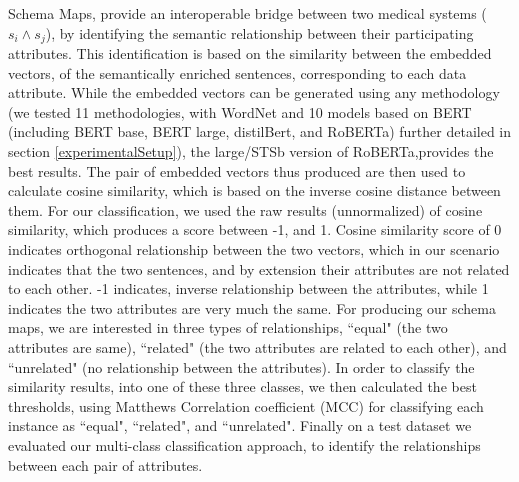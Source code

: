 \documentclass{ieeeaccess}
\begin{document}
Schema Maps, provide an interoperable bridge between two medical systems ($s_i \wedge s_j$), by identifying the semantic relationship between their participating attributes. This identification is based on the similarity between the embedded vectors, of the semantically enriched sentences, corresponding to each data attribute. While the embedded vectors can be generated using any methodology (we tested 11 methodologies, with WordNet and 10 models based on BERT (including BERT base, BERT large, distilBert, and RoBERTa) further detailed in section \ref{experimentalSetup}), the large/STSb version of RoBERTa\cite{reimers-2019-sentence-bert},provides the best results. The pair of embedded vectors thus produced are then used to calculate cosine similarity, which is based on the inverse cosine distance between them. For our classification, we used the raw results (unnormalized) of cosine similarity, which produces a score between -1, and 1. Cosine similarity score of 0 indicates orthogonal relationship between the two vectors, which in our scenario indicates that the two sentences, and by extension their attributes are not related to each other. -1 indicates, inverse relationship between the attributes, while 1 indicates the two attributes are very much the same.
For producing our schema maps, we are interested in three types of relationships, ``equal" (the two attributes are same), ``related" (the two attributes are related to each other), and ``unrelated" (no relationship between the attributes). In order to classify the similarity results, into one of these three classes, we then calculated the best thresholds, using Matthews Correlation coefficient (MCC) \cite{chicco2020advantages} for classifying each instance as ``equal", ``related", and ``unrelated". Finally on a test dataset we evaluated our multi-class classification approach, to identify the relationships between each pair of attributes.
\end{document}
